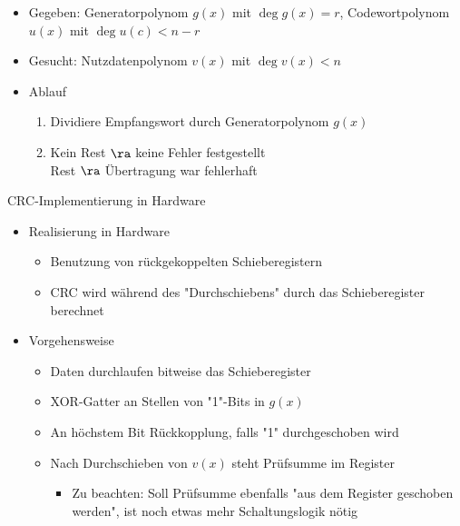       \begin{itemize}
        \item Gegeben: Generatorpolynom $g(x)$ mit $\deg g(x)=r$, Codewortpolynom $u(x)$ mit 
          $\deg u(c)<n-r$
        \item Gesucht: Nutzdatenpolynom $v(x)$ mit $\deg v(x)<n$
        \item Ablauf
          \begin{enumerate}[label=\arabic*)]
            \item Dividiere Empfangswort durch Generatorpolynom $g(x)$
            \item Kein Rest $\ra$ keine Fehler festgestellt\\
              Rest $\ra$ Übertragung war fehlerhaft
          \end{enumerate}
      \end{itemize}
      CRC-Implementierung in Hardware
      \begin{itemize}
        \item Realisierung in Hardware
          \begin{itemize}
            \item Benutzung von rückgekoppelten Schieberegistern
            \item CRC wird während des "Durchschiebens" durch das Schieberegister berechnet
          \end{itemize}
        \item Vorgehensweise
          \begin{itemize}
            \item Daten durchlaufen bitweise das Schieberegister
            \item XOR-Gatter an Stellen von "1"-Bits in $g(x)$
            \item An höchstem Bit Rückkopplung, falls "1" durchgeschoben wird
            \item Nach Durchschieben von $v(x)$ steht Prüfsumme im Register
              \begin{itemize}
                \item Zu beachten: Soll Prüfsumme ebenfalls "aus dem Register geschoben werden", ist
                  noch etwas mehr Schaltungslogik nötig
              \end{itemize}
          \end{itemize}
      \end{itemize}
